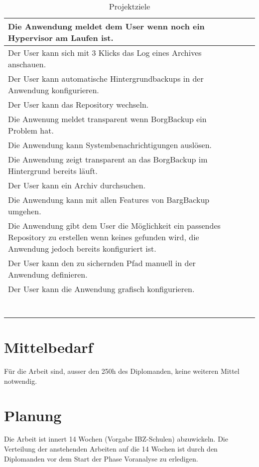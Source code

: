 \documentclass[a4paper,11pt]{article}
\begin{document}
\begin{longtable}{|p{9cm}|p{1.5cm}|p{2cm}|}
\hline
Die Anwendung meldet dem User wenn noch ein Hypervisor am Laufen ist. &  & \\
\hline
Der User kann sich mit 3 Klicks das Log eines Archives anschauen. &  & \\
\hline
Der User kann automatische Hintergrundbackups in der Anwendung konfigurieren. &  & \\
\hline
Der User kann das Repository wechseln. &  & \\
\hline
Die Anwenung meldet transparent wenn BorgBackup ein Problem hat. &  & \\
\hline
Die Anwendung kann Systembenachrichtigungen auslösen. &  & \\
\hline
Die Anwendung zeigt transparent an das BorgBackup im Hintergrund bereits läuft. &  & \\
\hline
Der User kann ein Archiv durchsuchen. &  & \\
\hline
Die Anwendung kann mit allen Features von BargBackup umgehen. &  & \\
\hline
Die Anwendung gibt dem User die Möglichkeit ein passendes Repository zu erstellen wenn keines gefunden wird, die Anwendung jedoch bereits konfiguriert ist. &  & \\
\hline
Der User kann den zu sichernden Pfad manuell in der Anwendung definieren. &  & \\
Der User kann die Anwendung grafisch konfigurieren. &  & \\
 &  & \\
 &  & \\
 &  & \\
 &  & \\
 &  & \\
 &  & \\
\hline
\caption{\label{tab:org20a0d42}
Projektziele}
\\
\end{longtable}

\section{Mittelbedarf}
\label{sec:org18fd829}
Für die Arbeit sind, ausser den 250h des Diplomanden, keine weiteren
Mittel notwendig.

\section{Planung}
\label{sec:org6d8741c}

Die Arbeit ist innert 14 Wochen (Vorgabe IBZ-Schulen) abzuwickeln. Die
Verteilung der anstehenden Arbeiten auf die 14 Wochen ist durch den
Diplomanden vor dem Start der Phase Voranalyse zu erledigen.
\end{document}
